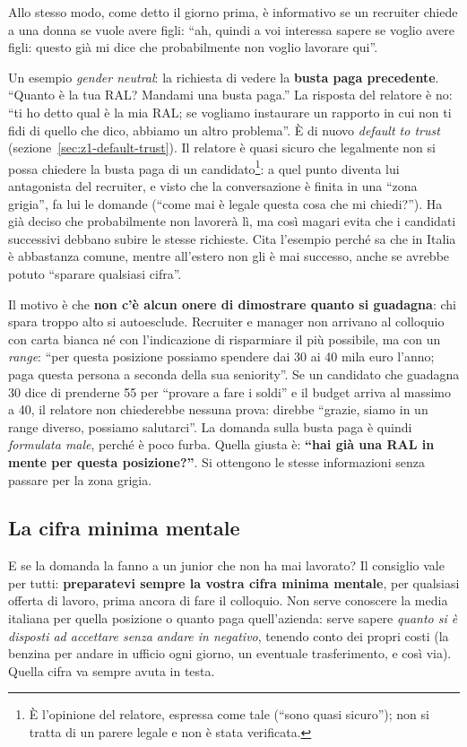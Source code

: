 Allo stesso modo, come detto il giorno prima, è informativo se un recruiter
chiede a una donna se vuole avere figli: ``ah, quindi a voi interessa sapere se
voglio avere figli: questo già mi dice che probabilmente non voglio lavorare
qui''.

Un esempio \emph{gender neutral}: la richiesta di vedere la \textbf{busta paga
precedente}. ``Quanto è la tua RAL? Mandami una busta paga.'' La risposta del
relatore è no: ``ti ho detto qual è la mia RAL; se vogliamo instaurare un
rapporto in cui non ti fidi di quello che dico, abbiamo un altro problema''. È
di nuovo \emph{default to trust} (sezione~\ref{sec:z1-default-trust}). Il
relatore è quasi sicuro che legalmente non si possa chiedere la busta paga di
un candidato\footnote{È l'opinione del relatore, espressa come tale (``sono
quasi sicuro''); non si tratta di un parere legale e non è stata verificata.}:
a quel punto diventa lui antagonista del recruiter, e visto che la
conversazione è finita in una ``zona grigia'', fa lui le domande (``come mai è
legale questa cosa che mi chiedi?''). Ha già deciso che probabilmente non
lavorerà lì, ma così magari evita che i candidati successivi debbano subire le
stesse richieste. Cita l'esempio perché sa che in Italia è abbastanza comune,
mentre all'estero non gli è mai successo, anche se avrebbe potuto ``sparare
qualsiasi cifra''.

Il motivo è che \textbf{non c'è alcun onere di dimostrare quanto si
guadagna}: chi spara troppo alto si autoesclude. Recruiter e manager non
arrivano al colloquio con carta bianca né con l'indicazione di risparmiare il
più possibile, ma con un \emph{range}: ``per questa posizione possiamo
spendere dai 30 ai 40 mila euro l'anno; paga questa persona a seconda della
sua seniority''. Se un candidato che guadagna 30 dice di prenderne 55 per
``provare a fare i soldi'' e il budget arriva al massimo a 40, il relatore non
chiederebbe nessuna prova: direbbe ``grazie, siamo in un range diverso, possiamo
salutarci''. La domanda sulla busta paga è quindi \emph{formulata male}, perché
è poco furba. Quella giusta è: \textbf{``hai già una RAL in mente per questa
posizione?''}. Si ottengono le stesse informazioni senza passare per la zona
grigia.

\subsection{La cifra minima mentale}

E se la domanda la fanno a un junior che non ha mai lavorato? Il consiglio vale
per tutti: \textbf{preparatevi sempre la vostra cifra minima mentale}, per
qualsiasi offerta di lavoro, prima ancora di fare il colloquio. Non serve
conoscere la media italiana per quella posizione o quanto paga quell'azienda:
serve sapere \emph{quanto si è disposti ad accettare senza andare in negativo},
tenendo conto dei propri costi (la benzina per andare in ufficio ogni giorno, un
eventuale trasferimento, e così via). Quella cifra va sempre avuta in testa.


